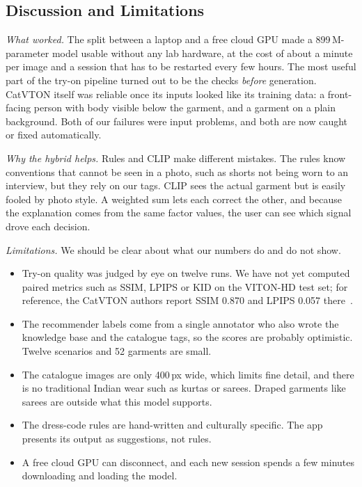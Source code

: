 \documentclass{article}
\begin{document}
\subsection{Discussion and Limitations}
\label{sec:disc}

\emph{What worked.} The split between a laptop and a free cloud GPU made a 899\,M-parameter model usable
without any lab hardware, at the cost of about a minute per image and a session that has to be
restarted every few hours. The most useful part of the try-on pipeline turned out to be the checks
\emph{before} generation. CatVTON itself was reliable once its inputs looked like its training data:
a front-facing person with body visible below the garment, and a garment on a plain background. Both
of our failures were input problems, and both are now caught or fixed automatically.

\emph{Why the hybrid helps.} Rules and CLIP make different mistakes. The rules know conventions that
cannot be seen in a photo, such as shorts not being worn to an interview, but they rely on our tags.
CLIP sees the actual garment but is easily fooled by photo style. A weighted sum lets each correct the
other, and because the explanation comes from the same factor values, the user can see which signal
drove each decision.

\emph{Limitations.} We should be clear about what our numbers do and do not show.
\begin{itemize}
\item Try-on quality was judged by eye on twelve runs. We have not yet computed paired metrics such as
SSIM, LPIPS or KID on the VITON-HD test set; for reference, the CatVTON authors report SSIM 0.870 and
LPIPS 0.057 there~\cite{catvton}.
\item The recommender labels come from a single annotator who also wrote the knowledge base and the
catalogue tags, so the scores are probably optimistic. Twelve scenarios and 52 garments are small.
\item The catalogue images are only 400\,px wide, which limits fine detail, and there is no
traditional Indian wear such as kurtas or sarees. Draped garments like sarees are outside what this
model supports.
\item The dress-code rules are hand-written and culturally specific. The app presents its output as
suggestions, not rules.
\item A free cloud GPU can disconnect, and each new session spends a few minutes downloading and loading the model.
\end{itemize}
\end{document}
